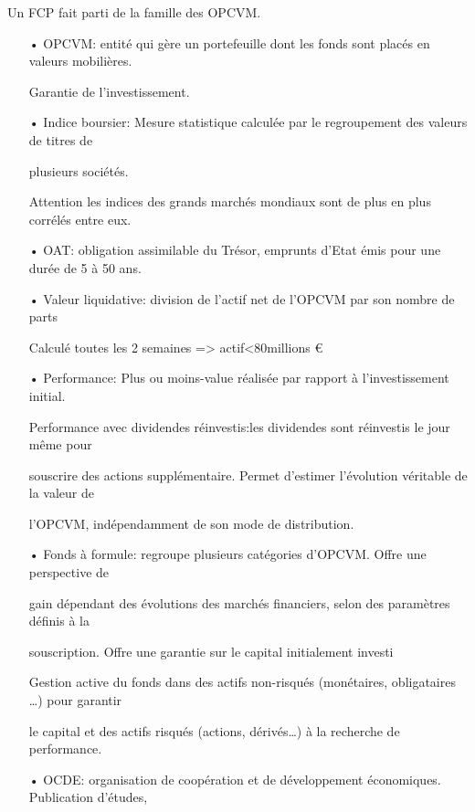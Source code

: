 \documentclass[french,12pt,a4paper]{article}
\begin{document}
Un FCP fait parti de la famille des OPCVM.\\
\begin{itemize}


\item[•]
OPCVM: entité qui gère un portefeuille dont les fonds sont placés en valeurs mobilières. 

Garantie de l’investissement.

\item[•]
Indice boursier: Mesure statistique calculée par le regroupement des valeurs de titres de 

plusieurs sociétés.

Attention les indices des grands marchés mondiaux sont de plus en plus corrélés entre eux.

\item[•]
OAT: obligation assimilable du Trésor, emprunts d’Etat émis pour une durée de 5 à 50 ans.

\item[•]
Valeur liquidative: division de l’actif net de l’OPCVM par son nombre de parts

Calculé toutes les 2 semaines => actif<80millions €

\item[•]
Performance: Plus ou moins-value réalisée par rapport à l’investissement initial.

Performance avec dividendes réinvestis:les dividendes sont réinvestis le jour même pour 

souscrire des actions supplémentaire. Permet d’estimer l’évolution véritable de la valeur de 

l’OPCVM, indépendamment de son mode de distribution. 

\item[•]
Fonds à formule: regroupe plusieurs catégories d’OPCVM. Offre une perspective de 

gain dépendant des évolutions des marchés financiers, selon des paramètres définis à la 

souscription. Offre une garantie sur le capital initialement investi

Gestion active du fonds dans des actifs non-risqués (monétaires, obligataires …) pour garantir 

le capital et des actifs risqués (actions, dérivés…) à la recherche de performance.

\item[•]
OCDE: organisation de coopération et de développement économiques. Publication d’études, 


\end{itemize}
\end{document}
